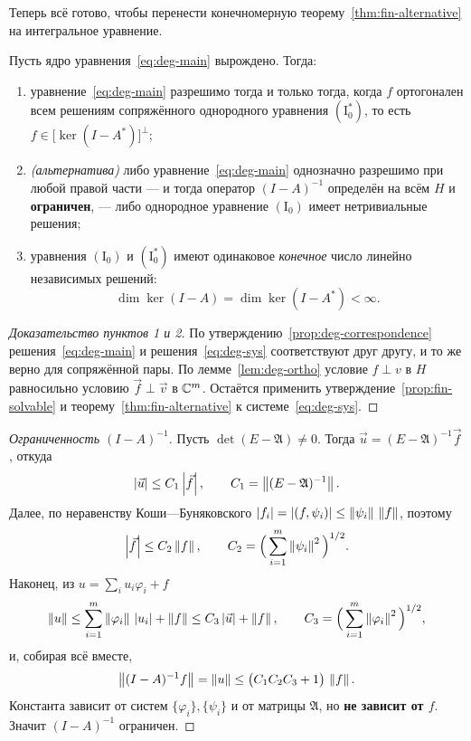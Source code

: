 Теперь всё готово, чтобы перенести конечномерную
теорему~\ref{thm:fin-alternative} на интегральное уравнение.

\begin{theorem}\label{thm:deg-alternative}
Пусть ядро уравнения~\eqref{eq:deg-main} вырождено. Тогда:
\begin{enumerate}[label=\arabic*), leftmargin=2em]
  \item уравнение~\eqref{eq:deg-main} разрешимо тогда и только тогда, когда
        $f$ ортогонален всем решениям сопряжённого однородного уравнения
        $(\mathrm{I}_0^*)$, то есть $f \in \big[\ker(I - A^*)\big]^{\perp}$;
  \item \emph{(альтернатива)} либо уравнение~\eqref{eq:deg-main} однозначно
        разрешимо при любой правой части — и тогда оператор $(I-A)^{-1}$
        определён на всём $H$ и \textbf{ограничен}, — либо однородное
        уравнение $(\mathrm{I}_0)$ имеет нетривиальные решения;
  \item уравнения $(\mathrm{I}_0)$ и $(\mathrm{I}_0^*)$ имеют одинаковое
        \emph{конечное} число линейно независимых решений:
        \[
          \dim \ker (I - A) = \dim \ker (I - A^*) < \infty .
        \]
\end{enumerate}
\end{theorem}

\begin{proof}[Доказательство пунктов 1 и 2]
По утверждению~\ref{prop:deg-correspondence} решения~\eqref{eq:deg-main} и
решения~\eqref{eq:deg-sys} соответствуют друг другу, и то же верно для
сопряжённой пары. По лемме~\ref{lem:deg-ortho} условие $f \perp v$ в $H$
равносильно условию $\vec f \perp \vec v$ в $\mathbb{C}^m$. Остаётся применить
утверждение~\ref{prop:fin-solvable} и теорему~\ref{thm:fin-alternative} к
системе~\eqref{eq:deg-sys}.
\end{proof}

\begin{proof}[Ограниченность $(I-A)^{-1}$]
Пусть $\det(E - \mathfrak{A}) \ne 0$. Тогда
$\vec u = (E - \mathfrak{A})^{-1}\vec f$, откуда
\[
  \left\lvert \vec u \right\rvert \le C_1 \left\lvert \vec f \right\rvert,
  \qquad C_1 = \left\lVert (E-\mathfrak{A})^{-1} \right\rVert .
\]
Далее, по неравенству Коши—Буняковского $\left\lvert f_i \right\rvert = \left\lvert (f,\psi_i) \right\rvert \le
\left\lVert \psi_i \right\rVert\,\left\lVert f \right\rVert$, поэтому
\[
  \left\lvert \vec f \right\rvert \le C_2 \left\lVert f \right\rVert,
  \qquad C_2 = \Big(\sum_{i=1}^{m}\left\lVert \psi_i \right\rVert^2\Big)^{1/2} .
\]
Наконец, из $u = \sum_i u_i \varphi_i + f$
\[
  \left\lVert u \right\rVert \le \sum_{i=1}^{m} \left\lVert \varphi_i \right\rVert\,\left\lvert u_i \right\rvert + \left\lVert f \right\rVert
  \le C_3 \left\lvert \vec u \right\rvert + \left\lVert f \right\rVert ,
  \qquad C_3 = \Big(\sum_{i=1}^{m}\left\lVert \varphi_i \right\rVert^2\Big)^{1/2} ,
\]
и, собирая всё вместе,
\[
  \left\lVert (I-A)^{-1} f \right\rVert = \left\lVert u \right\rVert \le \big(C_1 C_2 C_3 + 1\big)\,\left\lVert f \right\rVert .
\]
Константа зависит от систем $\{\varphi_i\}, \{\psi_i\}$ и от матрицы
$\mathfrak{A}$, но \textbf{не зависит от $f$}. Значит $(I-A)^{-1}$ ограничен.
\end{proof}

